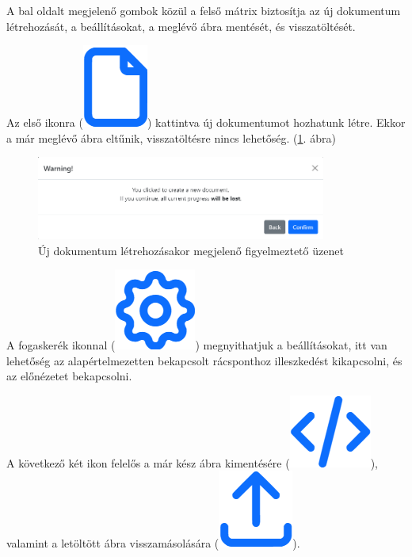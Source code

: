 
A bal oldalt megjelenő gombok közül a felső mátrix biztosítja az új dokumentum létrehozását, a beállításokat, a meglévő ábra mentését, és visszatöltését.

Az első ikonra 
(\includegraphics[height=\fontcharht\font`\B]{images/new.png})
kattintva új dokumentumot hozhatunk létre. Ekkor a már meglévő ábra eltűnik, visszatöltésre nincs lehetőség. (\ref{fig:new}. ábra)

\begin{figure}[!h]
	\centering
	\includegraphics[width=0.85\textwidth]{images/new_modal.png}
	\caption{Új dokumentum létrehozásakor megjelenő figyelmeztető üzenet}
	\label{fig:new}
\end{figure}

A fogaskerék ikonnal 
(\includegraphics[height=\fontcharht\font`\B]{images/settings.png})
megnyithatjuk a beállításokat, itt van lehetőség az alapértelmezetten bekapcsolt rácsponthoz illeszkedést kikapcsolni, és az előnézetet bekapcsolni.

A következő két ikon felelős a már kész ábra kimentésére 
(\includegraphics[height=\fontcharht\font`\B]{images/save.png}),
valamint a letöltött ábra visszamásolására
(\includegraphics[height=\fontcharht\font`\B]{images/load.png}).

